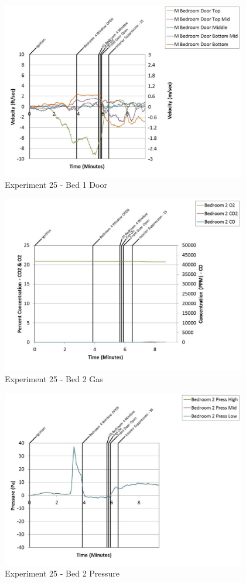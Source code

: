 \documentclass{article}
\begin{document}
\begin{appendices}
	\clearpage

	\begin{figure}[h!]
		\centering
		\includegraphics[height=3.05in]{0_Images/Results_Charts/Exp_25_Charts/Bed1Door.pdf}
		\caption{Experiment 25 - Bed 1 Door}
	\end{figure}
 

	\begin{figure}[h!]
		\centering
		\includegraphics[height=3.05in]{0_Images/Results_Charts/Exp_25_Charts/Bed2Gas.pdf}
		\caption{Experiment 25 - Bed 2 Gas}
	\end{figure}
 
	\clearpage

	\begin{figure}[h!]
		\centering
		\includegraphics[height=3.05in]{0_Images/Results_Charts/Exp_25_Charts/Bed2Pressure.pdf}
		\caption{Experiment 25 - Bed 2 Pressure}
	\end{figure}
 


\end{appendices}
\end{document}
